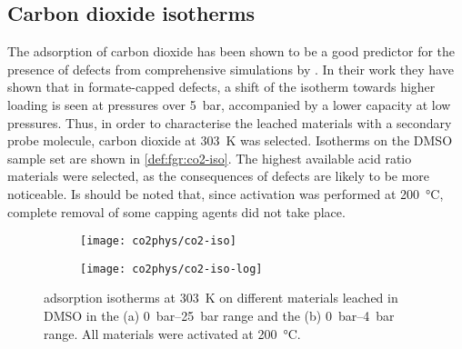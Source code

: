 
\subsection{Carbon dioxide isotherms}\label{def:co2}

The adsorption of carbon dioxide has been shown to be a good 
predictor for the presence of defects from comprehensive simulations
by \citet{thorntonDefectsMetalOrganic2016}.
In their work they have shown that in formate-capped defects, 
a shift of the  isotherm towards
higher loading is seen at pressures over \SI{5}{\bar}, accompanied 
by a lower capacity at low pressures. Thus, in order to characterise
the leached materials with a secondary probe molecule, carbon dioxide
at \SI{303}{\kelvin} was selected. Isotherms on the DMSO sample 
set are shown in \autoref{def:fgr:co2-iso}. The highest available 
acid ratio materials were selected, as the consequences of defects 
are likely to be more noticeable. Is should be noted that, since
activation was performed at \SI{200}{\degreeCelsius}, complete removal 
of some capping agents did not take place.

\begin{figure}[htb]
    \centering

    \begin{subfigure}{0.5\linewidth}
		\texttt{[image: co2phys/co2-iso]}%
		\caption{}%
		\label{def:fgr:co2-iso-reg}
	\end{subfigure}%
	\begin{subfigure}{0.5\linewidth}
		\texttt{[image: co2phys/co2-iso-log]}%
		\caption{}%
		\label{def:fgr:co2-iso-log}
	\end{subfigure}%

    \caption{
         adsorption isotherms at \SI{303}{\kelvin} on different
        materials leached in DMSO in the (a) \SIrange{0}{25}{\bar} range
        and the (b) \SIrange{0}{4}{\bar} range. All materials were 
        activated at \SI{200}{\degreeCelsius}.
    }\label{def:fgr:co2-iso}
\end{figure}


